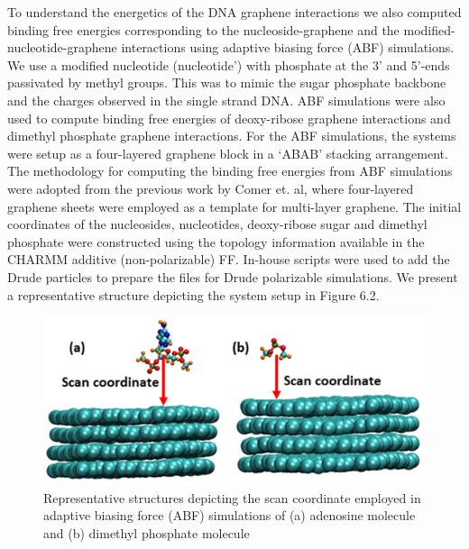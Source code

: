 To understand the energetics of the DNA graphene interactions we also computed binding free energies corresponding to the nucleoside-graphene and the modified-nucleotide-graphene interactions using adaptive biasing force (ABF) simulations. We use a modified nucleotide (nucleotide') with phosphate at the 3’ and 5’-ends passivated by methyl groups. This was to mimic the sugar phosphate backbone and the charges observed in the single strand DNA. ABF simulations were also used to compute binding free energies of deoxy-ribose graphene interactions and dimethyl phosphate graphene interactions. For the ABF simulations, the systems were setup as a four-layered graphene block in a ‘ABAB’ stacking arrangement. The methodology for computing the binding free energies from ABF simulations were adopted from the previous work by Comer et. al, where four-layered graphene sheets were employed as a template for multi-layer graphene.\supercite{comer_predicting_2015} The initial coordinates of the nucleosides, nucleotides, deoxy-ribose sugar and dimethyl phosphate were constructed using the topology information available in the CHARMM additive (non-polarizable) FF.\supercite{hart_optimization_2012,foloppe_all-atom_2000,mackerell_all-atom_2000} In-house scripts were used to add the Drude particles to prepare the files for Drude polarizable simulations. We present a representative structure depicting the system setup in Figure 6.2. 
\begin{figure}
    \centering
    \includegraphics[width=\textwidth]{Chapter4/Figures/Figure2.png}
    \caption[Representative structures depicting the scan coordinate employed in adaptive biasing force (ABF) simulations of adenosine and dimethyl phosphate molecules]{Representative structures depicting the scan coordinate employed in adaptive biasing force (ABF) simulations of (a) adenosine molecule and (b) dimethyl phosphate molecule}
\end{figure}

